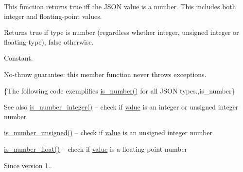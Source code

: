 This function returns true iff the J\+S\+ON value is a number. This includes both integer and floating-\/point values.

\begin{DoxyReturn}{Returns}
{\ttfamily true} if type is number (regardless whether integer, unsigned integer or floating-\/type), {\ttfamily false} otherwise.
\end{DoxyReturn}
Constant.

No-\/throw guarantee\+: this member function never throws exceptions.

\{The following code exemplifies {\ttfamily \hyperlink{classnlohmann_1_1basic__json_a957eb9594c7f0ca93212c30f3a400873}{is\+\_\+number()}} for all J\+S\+ON types.,is\+\_\+number\}

\begin{DoxySeeAlso}{See also}
\hyperlink{classnlohmann_1_1basic__json_a435c93d06ef28f8003c31f62ffe4aed1}{is\+\_\+number\+\_\+integer()} -- check if \hyperlink{classnlohmann_1_1basic__json_a407e73a037e6e3067ef7aa2c25a79f39}{value} is an integer or unsigned integer number 

\hyperlink{classnlohmann_1_1basic__json_aa388dc101bc285a98122a38fd2e3a9db}{is\+\_\+number\+\_\+unsigned()} -- check if \hyperlink{classnlohmann_1_1basic__json_a407e73a037e6e3067ef7aa2c25a79f39}{value} is an unsigned integer number 

\hyperlink{classnlohmann_1_1basic__json_a7641371be8a347f3c1e05ac089a74c36}{is\+\_\+number\+\_\+float()} -- check if \hyperlink{classnlohmann_1_1basic__json_a407e73a037e6e3067ef7aa2c25a79f39}{value} is a floating-\/point number
\end{DoxySeeAlso}
\begin{DoxySince}{Since}
version 1.. 
\end{DoxySince}
\hypertarget{classnlohmann_1_1basic__json_a7641371be8a347f3c1e05ac089a74c36}{}\label{classnlohmann_1_1basic__json_a7641371be8a347f3c1e05ac089a74c36} 
